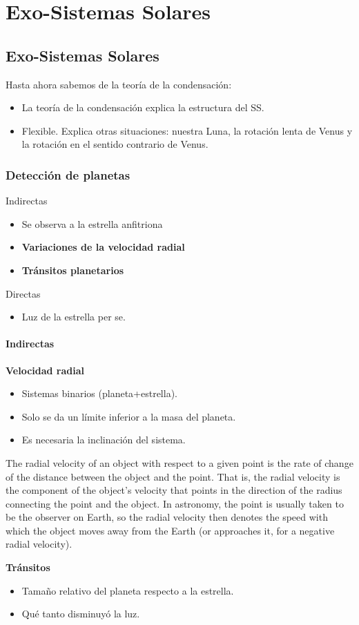 \documentclass[11pt,fleqn]{book} %
\begin{document}
\chapter{Exo-Sistemas Solares}
\section{Exo-Sistemas Solares}
Hasta ahora sabemos de la teoría de la condensación: 
\begin{itemize}
    \item La teoría de la condensación explica la estructura del SS.
    \item Flexible. Explica otras situaciones: nuestra Luna, la rotación lenta de Venus y la rotación en el sentido contrario de Venus. 
\end{itemize}

\subsection{Detección de planetas}
Indirectas
\begin{itemize}
    \item Se observa a la estrella anfitriona
    \item \textbf{Variaciones de la velocidad radial}
    \item \textbf{Tránsitos planetarios}
\end{itemize}
Directas
\begin{itemize}
    \item Luz de la estrella per se. 
\end{itemize}

\subsubsection{Indirectas}
\textbf{Velocidad radial}
\begin{itemize}
    \item Sistemas binarios (planeta+estrella). 
    \item Solo se da un límite inferior a la masa del planeta. 
    \item Es necesaria la inclinación del sistema.
\end{itemize}
\begin{remark}
The radial velocity of an object with respect to a given point is the rate of change of the distance between the object and the point. That is, the radial velocity is the component of the object's velocity that points in the direction of the radius connecting the point and the object. In astronomy, the point is usually taken to be the observer on Earth, so the radial velocity then denotes the speed with which the object moves away from the Earth (or approaches it, for a negative radial velocity).
\end{remark}
\textbf{Tránsitos}
\begin{itemize}
    \item Tamaño relativo del planeta respecto a la estrella.
    \item Qué tanto disminuyó la luz. 
\end{itemize}
\end{document}
